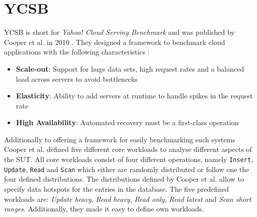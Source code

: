 \section{YCSB}
\label{sec:ycsb}
YCSB is short for \emph{Yahoo! Cloud Serving Benchmark} and was published by Cooper et al. in 2010 \cite{ycsb.2010}. They designed a framework to benchmark cloud applications with the following characteristics \cite[2]{ycsb.2010}:

\begin{itemize}
  \item \textbf{Scale-out}: Support for huge data sets, high request rates and a balanced load across servers to avoid bottlenecks
  \item \textbf{Elasticity}: Ability to add servers at runtime to handle spikes in the request rate
  \item \textbf{High Availability}: Automated recovery must be a first-class operation
\end{itemize}

Additionally to offering a framework for easily benchmarking such systems Cooper et al. defined five different core workloads to analyse different aspects of the \ac{SUT}. All core workloads consist of four different operations, namely \texttt{Insert}, \texttt{Update}, \texttt{Read} and \texttt{Scan} which either are randomly distributed or follow one the four defined distributions. The distributions defined by Cooper et al. allow to specify data hotspots for the entries in the database. The five predefined workloads are: \emph{Update heavy}, \emph{Read heavy}, \emph{Read only}, \emph{Read latest} and \emph{Scan short ranges}. Additionally, they made it easy to define own workloads. \cite[4 - 6]{ycsb.2010}